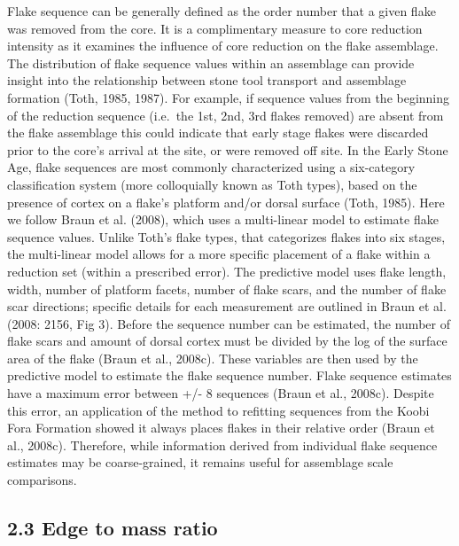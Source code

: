 \documentclass[]{elsarticle} %
\begin{document}
Flake sequence can be generally defined as the order number that a given
flake was removed from the core. It is a complimentary measure to core
reduction intensity as it examines the influence of core reduction on
the flake assemblage. The distribution of flake sequence values within
an assemblage can provide insight into the relationship between stone
tool transport and assemblage formation (Toth, 1985, 1987). For example,
if sequence values from the beginning of the reduction sequence
(i.e.~the 1st, 2nd, 3rd flakes removed) are absent from the flake
assemblage this could indicate that early stage flakes were discarded
prior to the core's arrival at the site, or were removed off site. In
the Early Stone Age, flake sequences are most commonly characterized
using a six-category classification system (more colloquially known as
Toth types), based on the presence of cortex on a flake's platform
and/or dorsal surface (Toth, 1985). Here we follow Braun et al. (2008),
which uses a multi-linear model to estimate flake sequence values.
Unlike Toth's flake types, that categorizes flakes into six stages, the
multi-linear model allows for a more specific placement of a flake
within a reduction set (within a prescribed error). The predictive model
uses flake length, width, number of platform facets, number of flake
scars, and the number of flake scar directions; specific details for
each measurement are outlined in Braun et al. (2008: 2156, Fig 3).
Before the sequence number can be estimated, the number of flake scars
and amount of dorsal cortex must be divided by the log of the surface
area of the flake (Braun et al., 2008c). These variables are then used
by the predictive model to estimate the flake sequence number. Flake
sequence estimates have a maximum error between +/- 8 sequences (Braun
et al., 2008c). Despite this error, an application of the method to
refitting sequences from the Koobi Fora Formation showed it always
places flakes in their relative order (Braun et al., 2008c). Therefore,
while information derived from individual flake sequence estimates may
be coarse-grained, it remains useful for assemblage scale comparisons.

\hypertarget{edge-to-mass-ratio}{%
\subsection{2.3 Edge to mass ratio}\label{edge-to-mass-ratio}}
\end{document}
